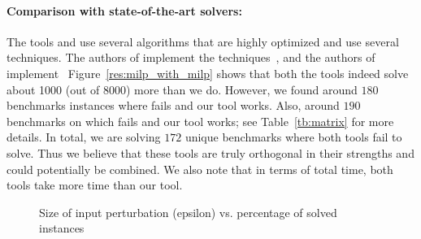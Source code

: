 \paragraph{Comparison with state-of-the-art solvers: }
The tools \alphabeta{} and \ovaltool{} use several algorithms that are highly optimized and use several techniques. The authors of \alphabeta{} implement the techniques~\cite{zhang2018efficient,wang2021beta,xu2020fast,zhang2022branch,tjeng2017evaluating}, 
and the authors of \ovaltool{} implement~\cite{bunel2018unified,bunel2020branch,bunel2020lagrangian,de2021scaling,de2021scaling,de2021scaling2,de2021improved}
Figure~\ref{res:milp_with_milp} shows that both the tools indeed solve about 1000 (out of 8000) more than we do. However, we found around $180$ benchmarks instances where \alphabeta{} fails and our tool works. Also, around $190$ benchmarks on which \ovaltool{} fails and our tool works; see Table~\ref{tb:matrix} for more details. In total, we are solving $172$ unique benchmarks where both tools fail to solve. Thus we believe that these tools are truly orthogonal in their strengths and could potentially be combined. We also note that in terms of total time, both tools take more time than our tool. 

\begin{figure}[t]

    \caption{Size of input perturbation (epsilon) vs. percentage of solved instances}
    \label{res:ep:milp_with_milp}
\end{figure}


